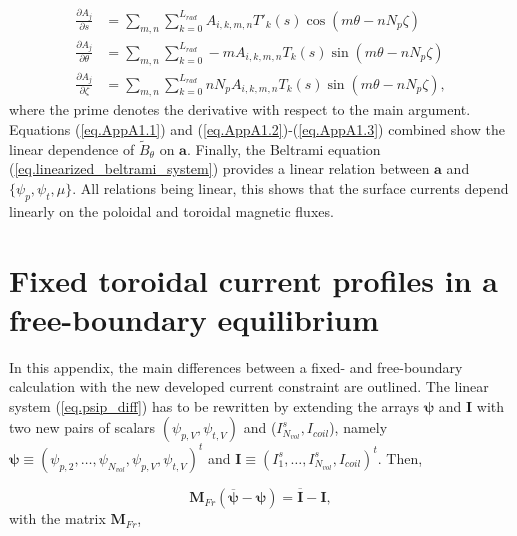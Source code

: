 \begin{align}
	\frac{\partial A_j}{\partial s} &= \sum_{m,n}\sum_{k=0}^{L_{rad}} A_{i,k,m,n}T'_k(s)\cos(m\theta-nN_p\zeta) \label{eq.AppA1.2} \\
	\frac{\partial A_j}{\partial \theta} &= \sum_{m,n}\sum_{k=0}^{L_{rad}} -mA_{i,k,m,n}T_k(s)\sin(m\theta-nN_p\zeta) \\
	\frac{\partial A_j}{\partial \zeta} &= \sum_{m,n}\sum_{k=0}^{L_{rad}} nN_pA_{i,k,m,n}T_k(s)\sin(m\theta-nN_p\zeta) , \label{eq.AppA1.3}
\end{align}
where the prime denotes the derivative with respect to the main argument. Equations (\ref{eq.AppA1.1}) and (\ref{eq.AppA1.2})-(\ref{eq.AppA1.3}) combined show the linear dependence of $\tilde{B}_\theta$ on $\mathbf{a}$. Finally, the Beltrami equation (\ref{eq.linearized_beltrami_system}) provides a linear relation between $\mathbf{a}$ and $\{\psi_p,\psi_t,\mu\}$. All relations being linear, this shows that the surface currents depend linearly on the poloidal and toroidal magnetic fluxes.

\chapter{Fixed toroidal current profiles in a free-boundary equilibrium}\label{appA}

In this appendix, the main differences between a fixed- and free-boundary calculation with the new developed current constraint are outlined. The linear system (\ref{eq.psip_diff}) has to be rewritten by extending the arrays $\bm{\psi}$ and $\mathbf{I}$ with two new pairs of scalars $(\psi_{p,V}, \psi_{t,V})$ and ($I^s_{N_{vol}}, I_{coil}$), namely $\bm{\psi}\equiv(\psi_{p,2},\ldots,\psi_{N_{vol}}, \psi_{p,V}, \psi_{t,V})^t$ and $\bm{I}\equiv(I^s_1,\ldots,I^s_{N_{vol}},I_{coil})^t$. Then,

\begin{equation}
	\mathbf{M}_{Fr} (\overbar{\bm{\psi}} - \bm{\psi}) = \overbar{\bm{I}} - \bm{I},
\end{equation}
with the matrix $\mathbf{M}_{Fr}$,

